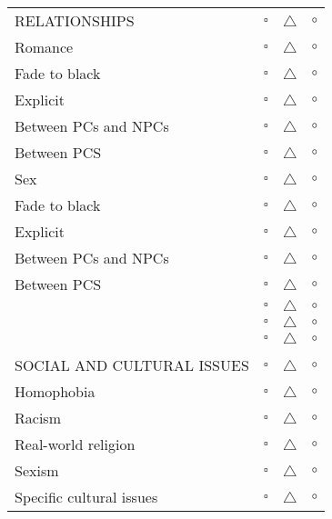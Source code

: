 \documentclass[11pt,twoside,a4paper]{article}
\begin{document}
\begin{multicols}{2}
\begin{tabular}{ p{} c c c}
		RELATIONSHIPS \dotfill			&	{\color{green} $\square$ }	&	{\color{yellow} $\triangle$ }	&	{\color{red} $\circ$ }	\\
		Romance \dotfill				&	{\color{green} $\square$ }	&	{\color{yellow} $\triangle$ }	&	{\color{red} $\circ$ }	\\
		Fade to black \dotfill			&	{\color{green} $\square$ }	&	{\color{yellow} $\triangle$ }	&	{\color{red} $\circ$ }	\\
		Explicit \dotfill				&	{\color{green} $\square$ }	&	{\color{yellow} $\triangle$ }	&	{\color{red} $\circ$ }	\\
		Between PCs and NPCs \dotfill	&	{\color{green} $\square$ }	&	{\color{yellow} $\triangle$ }	&	{\color{red} $\circ$ }	\\
		Between PCS \dotfill			&	{\color{green} $\square$ }	&	{\color{yellow} $\triangle$ }	&	{\color{red} $\circ$ }	\\
		Sex \dotfill					&	{\color{green} $\square$ }	&	{\color{yellow} $\triangle$ }	&	{\color{red} $\circ$ }	\\
		Fade to black \dotfill			&	{\color{green} $\square$ }	&	{\color{yellow} $\triangle$ }	&	{\color{red} $\circ$ }	\\
		Explicit \dotfill				&	{\color{green} $\square$ }	&	{\color{yellow} $\triangle$ }	&	{\color{red} $\circ$ }	\\
		Between PCs and NPCs \dotfill	&	{\color{green} $\square$ }	&	{\color{yellow} $\triangle$ }	&	{\color{red} $\circ$ }	\\
		Between PCS \dotfill			&	{\color{green} $\square$ }	&	{\color{yellow} $\triangle$ }	&	{\color{red} $\circ$ }	\\
		
		\hrulefill			&	{\color{green} $\square$ }	&	{\color{yellow} $\triangle$ }	&	{\color{red} $\circ$ }	\\
		\hrulefill			&	{\color{green} $\square$ }	&	{\color{yellow} $\triangle$ }	&	{\color{red} $\circ$ }	\\
		\hrulefill			&	{\color{green} $\square$ }	&	{\color{yellow} $\triangle$ }	&	{\color{red} $\circ$ }	\\
							&								&									&							\\
		
		SOCIAL AND CULTURAL ISSUES \dotfill		&	{\color{green} $\square$ }	&	{\color{yellow} $\triangle$ }	&	{\color{red} $\circ$ }	\\
		Homophobia \dotfill						&	{\color{green} $\square$ }	&	{\color{yellow} $\triangle$ }	&	{\color{red} $\circ$ }	\\
		Racism \dotfill							&	{\color{green} $\square$ }	&	{\color{yellow} $\triangle$ }	&	{\color{red} $\circ$ }	\\
		Real-world religion \dotfill			&	{\color{green} $\square$ }	&	{\color{yellow} $\triangle$ }	&	{\color{red} $\circ$ }	\\
		Sexism \dotfill							&	{\color{green} $\square$ }	&	{\color{yellow} $\triangle$ }	&	{\color{red} $\circ$ }	\\
		Specific cultural issues \dotfill		&	{\color{green} $\square$ }	&	{\color{yellow} $\triangle$ }	&	{\color{red} $\circ$ }	\\
		

\end{tabular}
\end{multicols}
\end{document}
